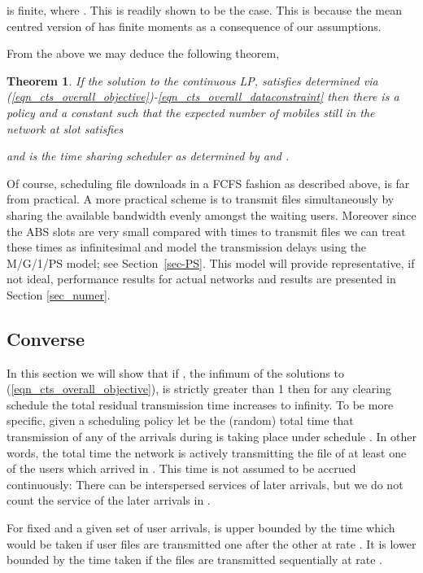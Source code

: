\documentclass[12pt, draftcls, onecolumn]{IEEEtranTCOM}
\newtheorem{theorem}{Theorem}
\begin{document}
{{}
is finite, where . This is
readily shown to be the case. This is because the mean centred version of  has
finite moments as a consequence of our assumptions. 

From the above we may deduce the following theorem,
\begin{theorem}
\label{theorem_fwd}
If the solution to the continuous LP, satisfies  determined via (\ref{eqn_cts_overall_objective})-\eqref{eqn_cts_overall_dataconstraint}
then there is a policy   and a constant  such that the expected number
 of mobiles still in the network at slot  satisfies

and  is the time sharing scheduler as determined by  and .
\end{theorem}

Of course, scheduling file downloads in a FCFS fashion as described above, is far from practical. A more
practical scheme is to transmit files simultaneously by sharing the available bandwidth evenly amongst
the waiting users. Moreover since the ABS slots  are very small compared with times to transmit
files we can treat these times as infinitesimal and model the transmission delays using the
M/G/1/PS model; see Section~\ref{sec-PS}. This model will provide representative, if not ideal, performance results for actual networks and results are presented in Section \ref{sec_numer}.


\subsection{Converse}
\label{sec_converse}

In this section we will show that if , the infimum of the solutions to (\ref{eqn_cts_overall_objective}), is strictly greater than 1
then for any clearing schedule  the total residual transmission time
increases to infinity. To be more specific, given a scheduling policy 
let  be the (random) total time that transmission of any of the
arrivals during  is taking place under schedule . In other
words, the total time the network is actively transmitting the file of at least
one of the users which arrived in . This time is not assumed to be accrued continuously: There can be interspersed services of later arrivals, but we do not count the
service of the later arrivals in .

For fixed  and a given
set of user arrivals,  is upper bounded by the time which would be
taken if user files are transmitted one after the other at rate .
It is lower bounded by the time taken if the files are transmitted sequentially
at rate .

}
\end{document}
